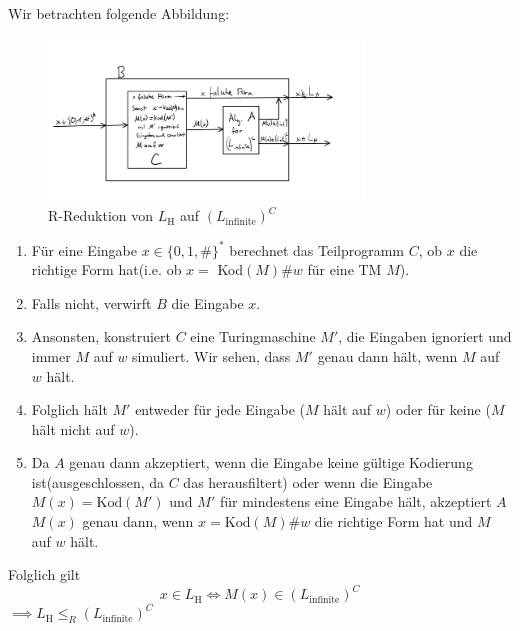 \documentclass[a4paper, 11pt]{article}
\begin{document}
                    Wir betrachten folgende Abbildung:
                    
                    \begin{figure}[htp]
                        \centering
                        \includegraphics[width=0.75\textwidth]{Images/18b_Zeichnung.png}
                        \caption{R-Reduktion von $L_{\text{H}}$ auf $(L_{\text{infinite}})^C$}
                    \end{figure}
                
                
                    \begin{enumerate}[label=\Roman*.]
                        \item Für eine Eingabe $x \in \{0,1,\#\}^*$ berechnet das Teilprogramm $C$, ob $x$ die richtige Form hat(i.e. ob $x = $ Kod$(M)\#w$ für eine TM $M$).
                        \item Falls nicht, verwirft $B$ die Eingabe $x$.
                        
                        \item Ansonsten, konstruiert $C$ eine Turingmaschine $M'$, die Eingaben ignoriert und immer $M$ auf $w$ simuliert. Wir sehen, dass $M'$ genau dann hält, wenn $M$ auf $w$ hält. 
                        \item Folglich hält $M'$ entweder für jede Eingabe ($M$ hält auf $w$) oder für keine ($M$ hält nicht auf $w$).
                         
                        \item Da $A$ genau dann akzeptiert, wenn die Eingabe keine gültige Kodierung ist(ausgeschlossen, da $C$ das herausfiltert) oder wenn die Eingabe $M(x)= \text{Kod}(M')$ und $M'$ für mindestens eine Eingabe hält, akzeptiert $A$ $M(x)$ genau dann, wenn $x = \text{Kod}(M)\#w$ die richtige Form hat und $M$ auf $w$ hält.
                    \end{enumerate}
                    
                    
                    Folglich gilt $$x \in L_{\text{H}} \iff M(x) \in (L_{\text{infinite}})^C$$
                    $\implies L_{\text{H}} \leq_R (L_{\text{infinite}})^C$ 
                
\end{document}
